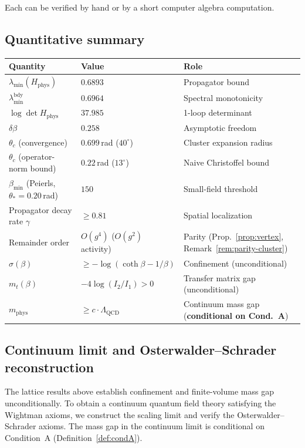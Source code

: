 \documentclass[11pt]{article}
\theoremstyle{definition}
\newcommand{\Lam}{\Lambda_{\mathrm{QCD}}}
\begin{document}
Each can be verified by hand or by a short computer algebra
computation.

\subsection{Quantitative summary}

\begin{center}
\begin{tabular}{lll}
\toprule
\textbf{Quantity} & \textbf{Value} & \textbf{Role}\\
\midrule
$\lambda_{\min}(H_{\mathrm{phys}})$ & $0.6893$ & Propagator bound\\
$\lambda_{\min}^{\mathrm{bdy}}$ & $0.6964$ & Spectral monotonicity\\
$\log\det H_{\mathrm{phys}}$ & $37.985$ & 1-loop determinant\\
$\delta\beta$ & $0.258$ & Asymptotic freedom\\
$\theta_c$ (convergence) & $0.699$\,rad ($40^\circ$) & Cluster expansion radius\\
$\theta_c$ (operator-norm bound) & $0.22$\,rad ($13^\circ$) & Naive Christoffel bound\\
$\beta_{\min}$ (Peierls, $\theta_*{=}0.20$\,rad) & $150$ &
Small-field threshold\\
Propagator decay rate $\gamma$ & $\ge 0.81$ & Spatial localization\\
Remainder order & $O(g^4)$ ($O(g^2)$ activity) & Parity (Prop.~\ref{prop:vertex},
Remark~\ref{rem:parity-cluster})\\
$\sigma(\beta)$ & $\ge-\log(\coth\beta-1/\beta)$ &
Confinement (unconditional)\\
$m_t(\beta)$ & $-4\log(I_2/I_1)>0$ & Transfer matrix gap
(unconditional)\\
$m_{\mathrm{phys}}$ & $\ge c\cdot\Lam$ &
Continuum mass gap (\textbf{conditional on Cond.~A})\\
\bottomrule
\end{tabular}
\end{center}

\subsection{Continuum limit and Osterwalder--Schrader reconstruction}

The lattice results above establish confinement and finite-volume
mass gap unconditionally.  To obtain a continuum quantum field theory
satisfying the Wightman axioms, we construct the scaling limit and verify
the Osterwalder--Schrader axioms.  The mass gap in the continuum limit
is conditional on Condition~A (Definition~\ref{def:condA}).
\end{document}
